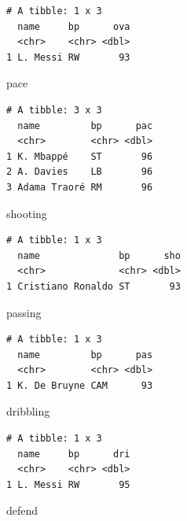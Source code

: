 \documentclass[
  letterpaper,
  DIV=11,
  numbers=noendperiod]{scrartcl}
\newenvironment{Shaded}{\begin{snugshade}}{\end{snugshade}}
\newcommand{\NormalTok}[1]{\textcolor[rgb]{0.00,0.23,0.31}{#1}}
\begin{document}
\begin{verbatim}
# A tibble: 1 x 3
  name     bp      ova
  <chr>    <chr> <dbl>
1 L. Messi RW       93
\end{verbatim}

\begin{Shaded}
\begin{Highlighting}[]
\NormalTok{pace}
\end{Highlighting}
\end{Shaded}

\begin{verbatim}
# A tibble: 3 x 3
  name         bp      pac
  <chr>        <chr> <dbl>
1 K. Mbappé    ST       96
2 A. Davies    LB       96
3 Adama Traoré RM       96
\end{verbatim}

\begin{Shaded}
\begin{Highlighting}[]
\NormalTok{shooting}
\end{Highlighting}
\end{Shaded}

\begin{verbatim}
# A tibble: 1 x 3
  name              bp      sho
  <chr>             <chr> <dbl>
1 Cristiano Ronaldo ST       93
\end{verbatim}

\begin{Shaded}
\begin{Highlighting}[]
\NormalTok{passing}
\end{Highlighting}
\end{Shaded}

\begin{verbatim}
# A tibble: 1 x 3
  name         bp      pas
  <chr>        <chr> <dbl>
1 K. De Bruyne CAM      93
\end{verbatim}

\begin{Shaded}
\begin{Highlighting}[]
\NormalTok{dribbling}
\end{Highlighting}
\end{Shaded}

\begin{verbatim}
# A tibble: 1 x 3
  name     bp      dri
  <chr>    <chr> <dbl>
1 L. Messi RW       95
\end{verbatim}

\begin{Shaded}
\begin{Highlighting}[]
\NormalTok{defend}
\end{Highlighting}
\end{Shaded}
\end{document}
